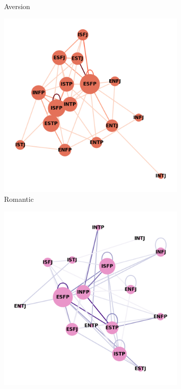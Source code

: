 \begin{figure}[!h]
\begin{subfigure}[b]{0.22\textwidth}
        \caption{Aversion}
        \label{fig:subgraph2}
    \end{subfigure}
    \hfill
    \begin{subfigure}[b]{0.22\textwidth} 
        \centering
        \includegraphics[width=\linewidth, scale=0.7]{images/romantic.png}
        \caption{Romantic}
        \label{fig:subgraph3}
    \end{subfigure}
    \hfill
    \begin{subfigure}[b]{0.22\textwidth} 
        \centering
        \includegraphics[width=\linewidth, scale=0.7]{images/friendship.png} 

\end{subfigure}
\end{figure}
